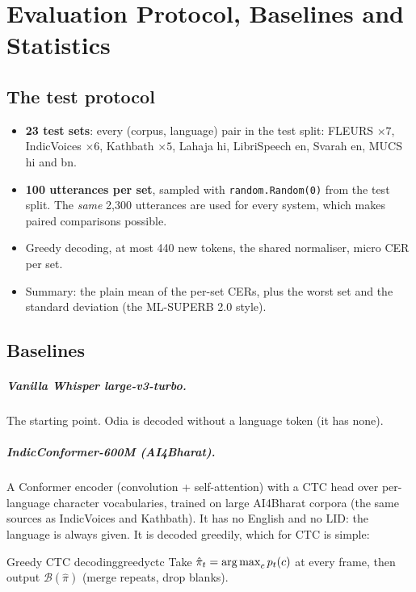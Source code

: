 \chapter{Evaluation Protocol, Baselines and Statistics}
\label{ch:eval}

\section{The test protocol}

\begin{itemize}
\item \textbf{23 test sets}: every (corpus, language) pair in the test split: FLEURS $\times7$, IndicVoices $\times6$, Kathbath
$\times5$, Lahaja hi, LibriSpeech en, Svarah en, MUCS hi and bn.
\item \textbf{100 utterances per set}, sampled with \texttt{random.Random(0)} from the test split. The \emph{same} 2{,}300 utterances
are used for every system, which makes paired comparisons possible.
\item Greedy decoding, at most 440 new tokens, the shared normaliser, micro CER per set.
\item Summary: the plain mean of the per-set CERs, plus the worst set and the standard deviation (the ML-SUPERB 2.0 style).
\end{itemize}

\section{Baselines}

\paragraph{Vanilla Whisper large-v3-turbo.} The starting point. Odia is decoded without a language token (it has none).

\paragraph{IndicConformer-600M (AI4Bharat).} A Conformer encoder (convolution + self-attention) with a CTC head over per-language
character vocabularies, trained on large AI4Bharat corpora (the same sources as IndicVoices and Kathbath). It has no English and no
LID: the language is always given. It is decoded greedily, which for CTC is simple:

\begin{definition}{Greedy CTC decoding}{greedyctc}
Take $\hat\pi_t=\operatorname*{arg\,max}_c p_t(c)$ at every frame, then output $\mathcal B(\hat\pi)$ (merge repeats, drop blanks).
\end{definition}

